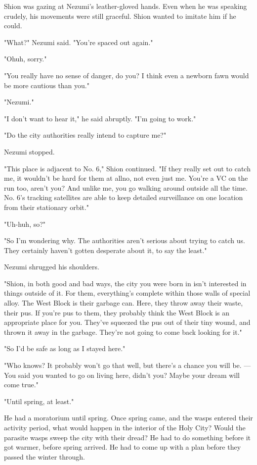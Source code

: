 Shion was gazing at Nezumi's leather-gloved hands. Even when he was
speaking crudely, his movements were still graceful. Shion wanted to
imitate him if he could.

"What?" Nezumi said. "You're spaced out again."

"Oh\el uh, sorry."

"You really have no sense of danger, do you? I think even a newborn fawn
would be more cautious than you."

"Nezumi."

"I don't want to hear it," he said abruptly. "I'm going to work."

"Do the city authorities really intend to capture me?"

Nezumi stopped.

"This place is adjacent to No. 6," Shion continued. "If they really set
out to catch me, it wouldn't be hard for them at all\el no, not even
just me. You're a VC on the run too, aren't you? And unlike me, you go
walking around outside all the time. No. 6's tracking satellites are
able to keep detailed surveillance on one location from their stationary
orbit."

"Uh-huh, so?"

"So I'm wondering why. The authorities aren't serious about trying to
catch us. They certainly haven't gotten desperate about it, to say the
least."

Nezumi shrugged his shoulders.

"Shion, in both good and bad ways, the city you were born in isn't
interested in things outside of it. For them, everything's complete
within those walls of special alloy. The West Block is their garbage
can. Here, they throw away their waste, their pus. If you're pus to
them, they probably think the West Block is an appropriate place for
you. They've squeezed the pus out of their tiny wound, and thrown it
away in the garbage. They're not going to come back looking for it."

"So I'd be safe as long as I stayed here."

"Who knows? It probably won't go that well, but there's a chance you
will be. ---You said you wanted to go on living here, didn't you? Maybe
your dream will come true."

"Until spring, at least."

He had a moratorium until spring. Once spring came, and the wasps
entered their activity period, what would happen in the interior of the
Holy City? Would the parasite wasps sweep the city with their dread? He
had to do something before it got warmer, before spring arrived. He had
to come up with a plan before they passed the winter through.

